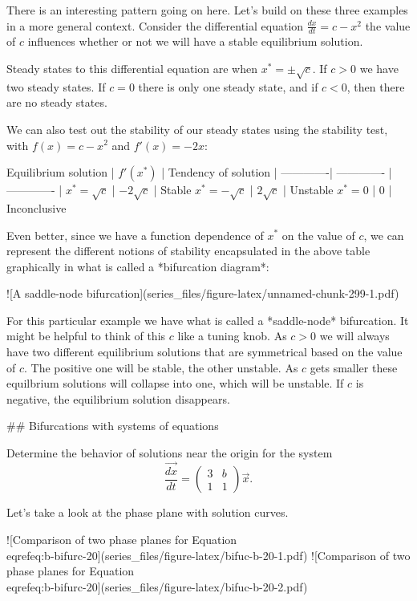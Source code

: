 \documentclass[
]{book}
\theoremstyle{definition}
\theoremstyle{definition}
\theoremstyle{definition}
\theoremstyle{remark}
\begin{document}
There is an interesting pattern going on here. Let's build on these three examples in a more general context. Consider the differential equation $\displaystyle \frac{dx}{dt} = c-x^{2}$ the value of $c$ influences whether or not we will have a stable equilibrium solution.

Steady states to this differential equation are when $x^{*}=\pm \sqrt{c}$.  If $c>0$ we have two steady states.  If $c=0$ there is only one steady state, and if $c<0$, then there are no steady states.

We can also test out the stability of our steady states using the stability test, with $f(x)=c-x^{2}$ and $f'(x)=-2x$:


Equilibrium solution | $f'(x^{*})$  | Tendency of solution | 
-------------| ------------- | ------------- | 
    $x^{*}=\sqrt{c}$ | $-2 \sqrt{c}$ | Stable 
    $x^{*}=-\sqrt{c}$ |  $2 \sqrt{c}$ | Unstable 
   $x^{*}=0$  | 0 | Inconclusive 


Even better, since we have a function dependence of $x^{*}$ on the value of $c$, we can represent the different notions of stability encapsulated in the above table graphically in what is called a *bifurcation diagram*:

![\label{fig:unnamed-chunk-299}A saddle-node bifurcation](series_files/figure-latex/unnamed-chunk-299-1.pdf) 

For this particular example we have what is called a *saddle-node* bifurcation.  It might be helpful to think of this $c$ like a tuning knob.  As $c>0$ we will always have two different equilibrium solutions that are symmetrical based on the value of $c$.  The positive one will be stable, the other unstable.  As $c$ gets smaller these equilbrium solutions will collapse into one, which will be unstable.  If $c$ is negative, the equilibrium solution disappears.

## Bifurcations with systems of equations 

 Determine the behavior of solutions near the origin for the system
 \begin{equation}
 \frac{\vec{dx}}{dt} = \begin{pmatrix} 3 & b \\ 1 & 1 \end{pmatrix} \vec{x}. \label{eq:b-bifurc-20}
 \end{equation}

Let's take a look at the phase plane with solution curves.

![\label{fig:bifuc-b-20-1}Comparison of two phase planes for Equation \\eqref{eq:b-bifurc-20}](series_files/figure-latex/bifuc-b-20-1.pdf) ![\label{fig:bifuc-b-20-2}Comparison of two phase planes for Equation \\eqref{eq:b-bifurc-20}](series_files/figure-latex/bifuc-b-20-2.pdf) 
\end{document}
